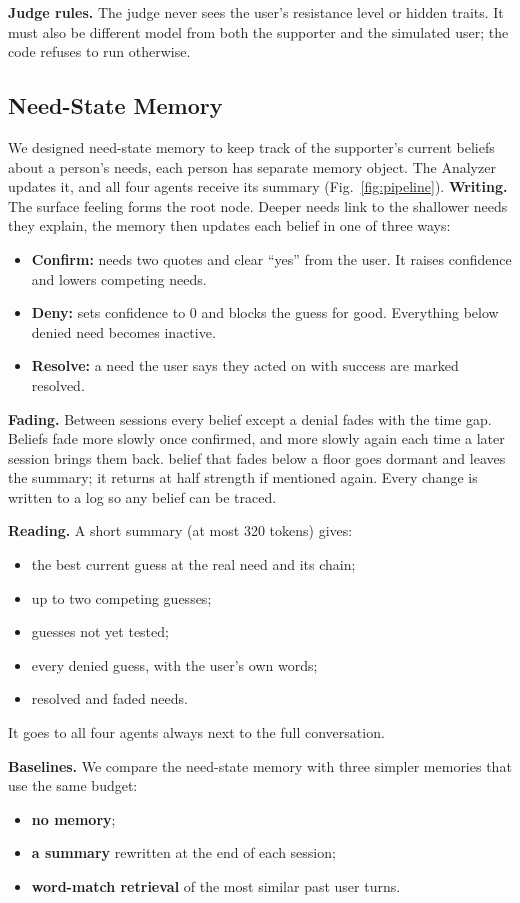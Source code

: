 \documentclass[journal]{IEEEtran}
\begin{document}
\textbf{Judge rules.} The judge never sees the user's resistance level or hidden traits. It must also be different model from both the supporter and the simulated user; the code refuses to run otherwise.

\subsection{Need-State Memory}\label{sec:memory}
We designed need-state memory to keep track of the supporter's current beliefs about a person's needs, each person has separate memory object. The Analyzer updates it, and all four agents receive its summary (Fig.~\ref{fig:pipeline}).
\textbf{Writing.} The surface feeling forms the root node. Deeper needs link to the shallower needs they explain, the memory then updates each belief in one of three ways:
\begin{itemize}
\item \textbf{Confirm:} needs two quotes and clear ``yes'' from the user. It raises confidence and lowers competing needs.
\item \textbf{Deny:} sets confidence to 0 and blocks the guess for good. Everything below denied need becomes inactive.
\item \textbf{Resolve:} a need the user says they acted on with success are marked resolved.
\end{itemize}

\textbf{Fading.} Between sessions every belief except a denial fades with the time gap. Beliefs fade more slowly once confirmed, and more slowly again each time a later session brings them back. belief that fades below a floor goes dormant and leaves the summary; it returns at half strength if mentioned again. Every change is written to a log so any belief can be traced.

\textbf{Reading.} A short summary (at most 320 tokens) gives:
\begin{itemize}
\item the best current guess at the real need and its chain;
\item up to two competing guesses;
\item guesses not yet tested;
\item every denied guess, with the user's own words;
\item resolved and faded needs.
\end{itemize}
It goes to all four agents always next to the full conversation.

\textbf{Baselines.} We compare the need-state memory with three simpler memories that use the same budget:
\begin{itemize}
\item \textbf{no memory};
\item \textbf{a summary} rewritten at the end of each session;
\item \textbf{word-match retrieval} of the most similar past user turns.
\end{itemize}
\end{document}
